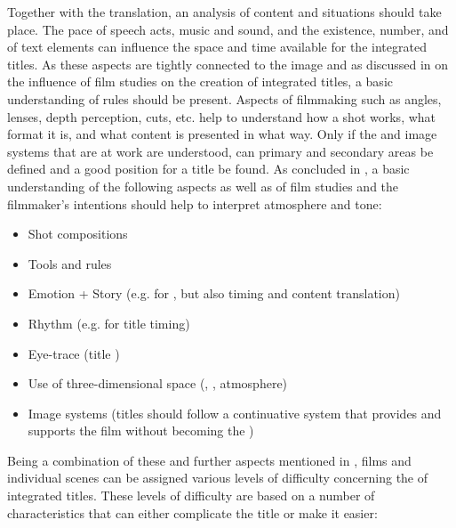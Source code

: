 Together with the translation, an analysis of content and situations should take place. The pace of speech acts, music and sound, and the existence, number, and  of text elements can influence the space and time available for the integrated titles. As these aspects are tightly connected to the image and as discussed in  on the influence of film studies on the creation of integrated titles, a basic understanding of  rules should be present. Aspects of filmmaking such as angles, lenses, depth perception, cuts, etc. help to understand how a shot works, what format it is, and what content is presented in what way. Only if the  and image systems that are at work are understood, can primary and secondary areas be defined and a good position for a title be found. As concluded in , a basic understanding of the following aspects as well as of film studies and the filmmaker’s intentions should help to interpret atmosphere and tone:

\begin{itemize}
\item Shot compositions
\item Tools and rules
\item Emotion + Story (e.g. for , but also timing and content translation)
\item Rhythm (e.g. for title timing)
\item Eye-trace (title )
\item Use of three-dimensional space (, , atmosphere)
\item Image systems (titles should follow a continuative system that provides  and supports the film without becoming the )
\end{itemize}

Being a combination of these and further aspects mentioned in , films and individual scenes can be assigned various levels of difficulty concerning the  of integrated titles. These levels of difficulty are based on a number of characteristics that can either complicate the title  or make it easier:


